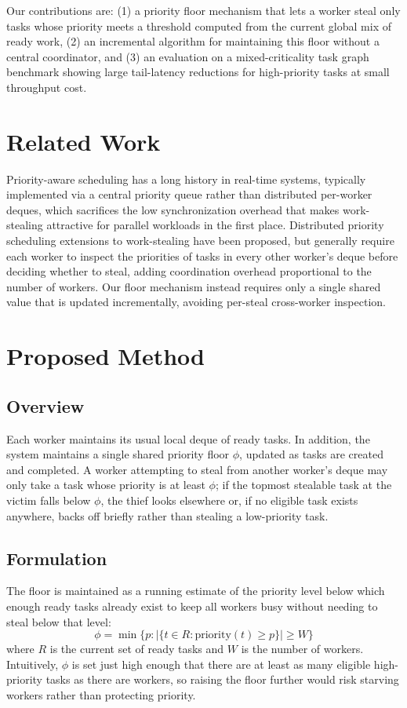 \documentclass[runningheads]{llncs}
\begin{document}
Our contributions are: (1) a priority floor mechanism that lets a worker steal only tasks whose priority meets a threshold computed from the current global mix of ready work, (2) an incremental algorithm for maintaining this floor without a central coordinator, and (3) an evaluation on a mixed-criticality task graph benchmark showing large tail-latency reductions for high-priority tasks at small throughput cost.

\section{Related Work}
Priority-aware scheduling has a long history in real-time systems, typically implemented via a central priority queue rather than distributed per-worker deques, which sacrifices the low synchronization overhead that makes work-stealing attractive for parallel workloads in the first place. Distributed priority scheduling extensions to work-stealing have been proposed, but generally require each worker to inspect the priorities of tasks in every other worker's deque before deciding whether to steal, adding coordination overhead proportional to the number of workers. Our floor mechanism instead requires only a single shared value that is updated incrementally, avoiding per-steal cross-worker inspection.

\section{Proposed Method}
\subsection{Overview}
Each worker maintains its usual local deque of ready tasks. In addition, the system maintains a single shared priority floor $\phi$, updated as tasks are created and completed. A worker attempting to steal from another worker's deque may only take a task whose priority is at least $\phi$; if the topmost stealable task at the victim falls below $\phi$, the thief looks elsewhere or, if no eligible task exists anywhere, backs off briefly rather than stealing a low-priority task.

\subsection{Formulation}
The floor is maintained as a running estimate of the priority level below which enough ready tasks already exist to keep all workers busy without needing to steal below that level:
\begin{equation}
\phi = \min\{p : |\{t \in R : \text{priority}(t) \geq p\}| \geq W\}
\label{eq:floor}
\end{equation}
where $R$ is the current set of ready tasks and $W$ is the number of workers. Intuitively, $\phi$ is set just high enough that there are at least as many eligible high-priority tasks as there are workers, so raising the floor further would risk starving workers rather than protecting priority.
\end{document}
